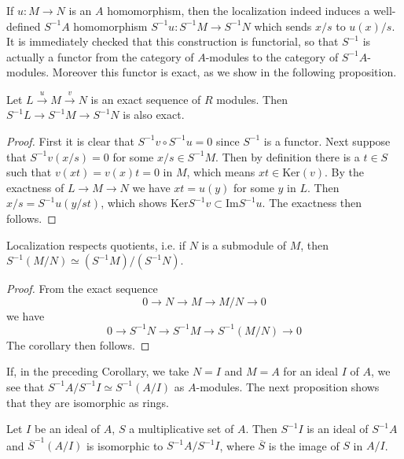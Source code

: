 \noindent
If $u:M\rightarrow N$ is an $A$ homomorphism, then the localization indeed
induces a well-defined $S^{-1}A$ homomorphism $S^{-1}u:S^{-1}M\rightarrow
S^{-1}N$ which sends $x/s$ to $u(x)/s$. It is immediately checked that
this construction is functorial, so that $S^{-1}$
is actually a functor from the category of $A$-modules to the
category of $S^{-1}A$-modules. Moreover this functor is exact,
as we show in the following proposition.

\begin{proposition}
\label{proposition-localization-exact}
Let $L\xrightarrow{u} M\xrightarrow{v} N$ is an exact sequence
of $R$ modules. Then
$S^{-1}L\rightarrow S^{-1}M\rightarrow S^{-1}N$ is also exact.
\end{proposition}

\begin{proof}
First it is clear that $S^{-1}v\circ S^{-1}u=0$ since $S^{-1}$ is a
functor. Next suppose that $S^{-1}v(x/s)=0$ for some $x/s\in
S^{-1}M$. Then by definition there is a $t\in S$ such that
$v(xt)=v(x)t=0$ in $M$, which means $xt\in\text{Ker}(v)$.
By the exactness of $L\rightarrow M\rightarrow
N$ we have $xt=u(y)$ for some $y$ in $L$. Then $x/s=S^{-1}u(y/st)$,
which shows $\text{Ker} S^{-1}v\subset\text{Im} S^{-1}u$. The exactness then
follows.
\end{proof}

\begin{lemma}
Localization respects quotients, i.e. if $N$ is a submodule of
$M$, then $S^{-1}(M/N)\simeq (S^{-1}M)/(S^{-1}N)$.
\end{lemma}

\begin{proof}
From the exact sequence
\[
0 \longrightarrow N \longrightarrow M \longrightarrow M/N \longrightarrow 0
\]
we have
\[
0 \longrightarrow S^{-1}N \longrightarrow S^{-1}M
\longrightarrow S^{-1}(M/N) \longrightarrow 0
\]
The corollary then follows.
\end{proof}

\noindent
If, in the preceding Corollary, we take $N=I$ and $M=A$ for an ideal $I$ of 
$A$, we see that $S^{-1}A/S^{-1}I \simeq S^{-1}(A/I)$ as $A$-modules. The next 
proposition shows that they are isomorphic as rings.

\begin{proposition}
\label{proposition-localize-quotient}
Let $I$ be an ideal of $A$, $S$ a multiplicative set of $A$. Then
$S^{-1}I$ is an ideal of $S^{-1}A$ and $\overline{S}^{-1}(A/I)$ is
isomorphic to $S^{-1}A/S^{-1}I$, where $\overline{S}$ is
the image of $S$ in $A/I$.
\end{proposition}

